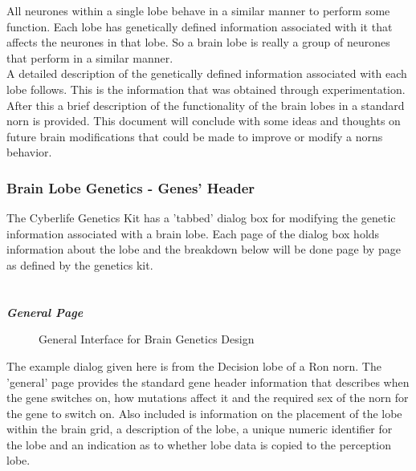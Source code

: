 \documentclass[11pt,twoside,a4paper]{article}
\begin{document}
All neurones within a single lobe behave in a similar manner to perform some function. Each lobe has genetically defined information associated with it that affects the neurones in that lobe. So a brain lobe is really a group of neurones that perform in a similar manner.~\\

A detailed description of the genetically defined information associated with each lobe follows. This is the information that was obtained through experimentation. After this a brief description of the functionality of the brain lobes in a standard norn is provided. This document will conclude with some ideas and thoughts on future brain modifications that could be made to improve or modify a norns behavior.

\subsubsection{Brain Lobe Genetics - Genes' Header}

The Cyberlife Genetics Kit has a 'tabbed' dialog box for modifying the genetic information associated with a brain lobe. Each page of the dialog box holds information about the lobe and the breakdown below will be done page by page as defined by the genetics kit.~\\~\\~\\

\textbf{\textit{General Page}}~\\

\begin{minipage}{0.4\linewidth}
\begin{figure}[H]
	\centerline {} %
	\caption{General Interface for Brain Genetics Design}
	\label{fig:brain_general}
\end{figure}
\end{minipage}
\begin{minipage}{0.1\linewidth}\end{minipage}
\begin{minipage}{0.5\linewidth}
The example dialog given here is from the Decision lobe of a Ron norn. The 'general' page provides the standard gene header information that describes when the gene switches on, how mutations affect it and the required sex of the norn for the gene to switch on. Also included is information on the placement of the lobe within the brain grid, a description of the lobe, a unique numeric identifier for the lobe and an indication as to whether lobe data is copied to the perception lobe.
\end{minipage}~\\~\\
\end{document}
